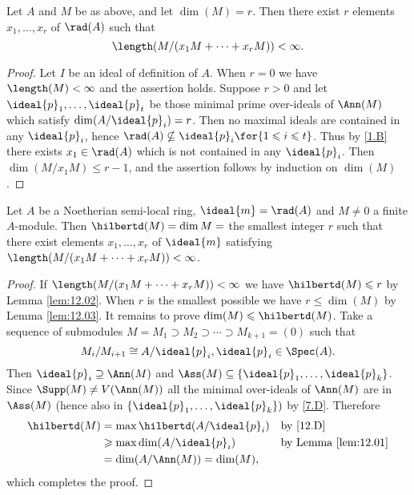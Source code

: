 \documentclass[../main]{subfiles}
\begin{document}
\begin{parlemma}\label{lem:12.03}
Let $A$ and $M$ be as above, and let $\dim(M)=r$. Then there exist $r$ elements $x_1, \ldots, x_r$ of $\rad(A)$ such that \[\length(M / (x_1 M+\cdots+x_r M))<\infty.\]
\end{parlemma}

\begin{proof}
Let $I$ be an ideal of definition of $A$. When $r=0$ we have $\length(M)<\infty$ and the assertion holds. Suppose $r>0$ and let $\ideal{p}_1, \ldots, \ideal{p}_t$ be those minimal prime over-ideals of $\Ann(M)$ which satisfy $\dim(A / \ideal{p}_i)=r$. Then no maximal ideals are contained in any $\ideal{p}_i$, hence $\rad(A) \nsubseteq \ideal{p}_i\for{1 \leqslant i \leqslant t}$. Thus by \ref{1.B} there exists $x_1 \in \rad(A)$ which is not contained in any $\ideal{p}_i$. Then $\dim(M / x_1 M) \leqslant r-1$, and the assertion follows by induction on $\dim(M)$.
\end{proof}

\begin{partheorem}\label{thm:017}
Let $A$ be a Noetherian semi-local ring, $\ideal{m}=\rad(A)$ and $M \neq 0$ a finite $A$-module. Then $\hilbertd(M)=\dim M=$ the smallest integer $r$ such that there exist elements $x_1,\ldots, x_r$ of $\ideal{m}$ satisfying $\length(M / (x_1 M+\cdots+x_r M))<\infty$.
\end{partheorem}

\begin{proof}
If $\length(M / (x_1 M+\cdots+x_r M))<\infty$ we have $\hilbertd(M)\leqslant r$ by Lemma \ref{lem:12.02}. When $r$ is the smallest possible we have $r \leqslant \dim(M)$ by Lemma \ref{lem:12.03}. It remains to prove $\dim(M) \leqslant \hilbertd(M)$. Take a sequence of submodules $M=M_1\supset M_2 \supset \cdots \supset M_{k+1}=(0)$ such that \[M_i / M_{i+1} \cong A / \ideal{p}_i, \ideal{p}_i \in \Spec(A).\] Then $\ideal{p}_i \supseteq\Ann(M)$ and $\Ass(M)\subseteq\{\ideal{p}_1, \ldots, \ideal{p}_k\}$. Since $\Supp(M) \neq V(\Ann(M))$ all the minimal over-ideals of $\Ann(M)$ are in $\Ass(M)$ (hence also in $\{\ideal{p}_1, \ldots, \ideal{p}_k\})$ by \ref{7.D}. Therefore
\begin{align*}
    \hilbertd(M)&=\max\hilbertd(A/\ideal{p}_i) & &\text{by \ref{12.D}}\\
    &\geqslant\max\dim(A/\ideal{p}_i) & &\text{by Lemma \ref{lem:12.01}}\\
    &=\dim(A/\Ann(M))=\dim(M), & &
\end{align*}
which completes the proof.
\end{proof} 
\end{document}
